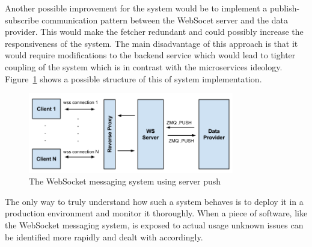 \noindent
Another possible improvement for the system would be to implement a publish-subscribe communication pattern between the WebSocet server and the data provider. This would make the fetcher redundant and could possibly increase the responsiveness of the system. The main disadvantage of this approach is that it would require modifications to the backend service which would lead to tighter coupling of the system which is in contrast with the microservices ideology. Figure~\ref{fig:websocketMessagingSystemServerPush} shows a possible structure of this of system implementation.
\\
\begin{figure}[h!]
	\centering
	\includegraphics[width=0.8\textwidth]{images/websocketMessagingSystemServerPush}
	\caption{The WebSocket messaging system using server push}
	\label{fig:websocketMessagingSystemServerPush}
\end{figure}

\noindent
The only way to truly understand how such a system behaves is to deploy it in a production environment and monitor it thoroughly. When a piece of software, like the WebSocket messaging system, is exposed to actual usage unknown issues can be identified more rapidly and dealt with accordingly.

